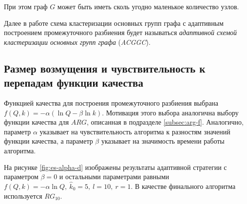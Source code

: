 При этом граф $G$ может быть иметь сколь угодно маленькое количество узлов.

Далее в работе схема кластеризации основных групп графа с адаптивным построением промежуточного разбиения будет называться \emph{адаптивной схемой кластеризации основных групп графа} (\emph{ACGGC}).



\subsection{Размер возмущения и чувствительность к перепадам функции качества}

Функцией качества для построения промежуточного разбиения выбрана $f(Q, k) = -\alpha(\ln Q - \beta \ln k)$. Мотивация этого выбора аналогична выбору функции качества для $ARG$, описанная в подразделе \ref{subsec:arg-f}. Аналогично, параметр $\alpha$ указывает на чувствительность алгоритма к разностям значений функции качества, а параметр $\beta$ указывает на значимость времени работы алгоритма.

На рисунке \ref{fig:es-alpha-d} изображены результаты адаптивной стратегии с параметром $\beta = 0$ и остальными параметрами равными $f(Q, k) = -\alpha \ln Q,\ \hat{k}_0 = 5,\ l = 10,\ r = 1$. В качестве финального алгоритма используется $RG_{10}$.

